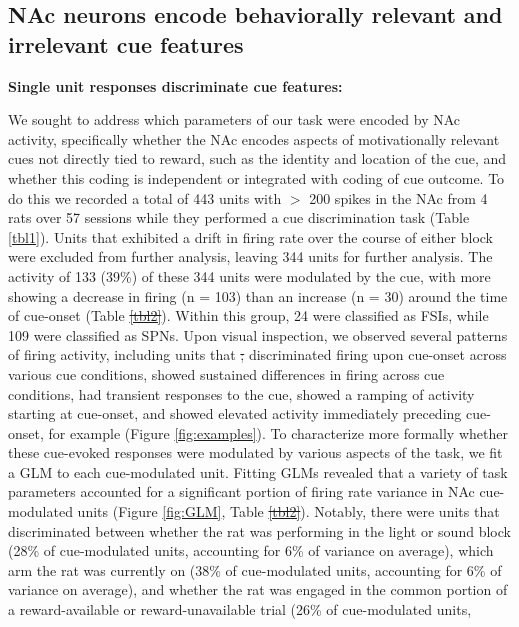 \documentclass[11pt]{article}
\providecommand{\DIFadd}[1]{{\protect\color{blue}\uwave{#1}}} %
\providecommand{\DIFdel}[1]{{\protect\color{red}\sout{#1}}}                      %
\providecommand{\DIFaddbegin}{} %
\providecommand{\DIFaddend}{} %
\providecommand{\DIFdelbegin}{} %
\providecommand{\DIFdelend}{} %
\newcommand{\DIFscaledelfig}{0.5}
\newlength{\DIFdelgraphicswidth} %
\newlength{\DIFdelgraphicsheight} %
\newcommand{\DIFaddincludegraphics}[2][]{{\color{blue}\fbox{\DIFOincludegraphics[#1]{#2}}}} %
\newcommand{\DIFdelincludegraphics}[2][]{%
\sbox{\DIFdelgraphicsbox}{\DIFOincludegraphics[#1]{#2}}%
\settoboxwidth{\DIFdelgraphicswidth}{\DIFdelgraphicsbox} %
\settoboxtotalheight{\DIFdelgraphicsheight}{\DIFdelgraphicsbox} %
\scalebox{\DIFscaledelfig}{%
\parbox[b]{\DIFdelgraphicswidth}{\usebox{\DIFdelgraphicsbox}\\[-\baselineskip] \rule{\DIFdelgraphicswidth}{0em}}\llap{\resizebox{\DIFdelgraphicswidth}{\DIFdelgraphicsheight}{%
\setlength{\unitlength}{\DIFdelgraphicswidth}%
\begin{picture}(1,1)%
\thicklines\linethickness{2pt} %
{\color[rgb]{1,0,0}\put(0,0){\framebox(1,1){}}}%
{\color[rgb]{1,0,0}\put(0,0){\line( 1,1){1}}}%
{\color[rgb]{1,0,0}\put(0,1){\line(1,-1){1}}}%
\end{picture}%
}\hspace*{3pt}}} %
} %
\DeclareRobustCommand{\DIFaddbegin}{\DIFOaddbegin \let\includegraphics\DIFaddincludegraphics} %
\DeclareRobustCommand{\DIFaddend}{\DIFOaddend \let\includegraphics\DIFOincludegraphics} %
\DeclareRobustCommand{\DIFdelbegin}{\DIFOdelbegin \let\includegraphics\DIFdelincludegraphics} %
\DeclareRobustCommand{\DIFdelend}{\DIFOaddend \let\includegraphics\DIFOincludegraphics} %
\begin{document}
{\subsection*{NAc neurons encode behaviorally relevant and irrelevant cue features}

{\bf Single unit responses discriminate cue features:}

We sought to address which parameters of our task were encoded by NAc activity,
specifically whether the NAc encodes aspects of motivationally relevant cues not
directly tied to reward, such as the identity and location of the cue, and
whether this coding is independent or integrated with coding of cue outcome. To
do this we recorded a total of 443 units with $>$ 200 spikes in the NAc from 4
rats over 57 sessions while they performed a cue discrimination task (Table
\ref{tbl1}). Units that exhibited a drift in firing rate over the course of
either block were excluded from further analysis, leaving 344 units for further
analysis. The activity of 133 (39\%) of these 344 units were modulated by the
cue, with more showing a decrease in firing (n = 103) than an increase (n = 30)
around the time of cue-onset (Table \DIFdelbegin \DIFdel{\ref{tbl2}}\DIFdelend \DIFaddbegin \DIFadd{\ref{tbl1}}\DIFaddend ). Within this group, 24 were
classified as FSIs, while 109 were classified as SPNs. Upon visual inspection,
we observed several patterns of firing activity, including units that
\DIFdelbegin \DIFdel{; }\DIFdelend discriminated firing upon cue-onset across various cue conditions, showed
sustained differences in firing across cue conditions, had transient responses
to the cue, showed a ramping of activity starting at cue-onset, and showed
elevated activity immediately preceding cue-onset, for example (Figure
\ref{fig:examples}). To characterize more formally whether these cue-evoked
responses were modulated by various aspects of the task, we fit a GLM to each
cue-modulated unit. Fitting GLMs revealed that a variety of task parameters
accounted for a significant portion of firing rate variance in NAc cue-modulated
units (Figure \ref{fig:GLM}, Table \DIFdelbegin \DIFdel{\ref{tbl2}}\DIFdelend \DIFaddbegin \DIFadd{\ref{tbl1}}\DIFaddend ). Notably, there were units that
discriminated between whether the rat was performing in the light or sound block
(28\% of cue-modulated units, accounting for 6\% of variance on average), which
arm the rat was currently on (38\% of cue-modulated units, accounting for 6\% of
variance on average), and whether the rat was engaged in the common portion of a
reward-available or reward-unavailable trial (26\% of cue-modulated units,
}
\end{document}
